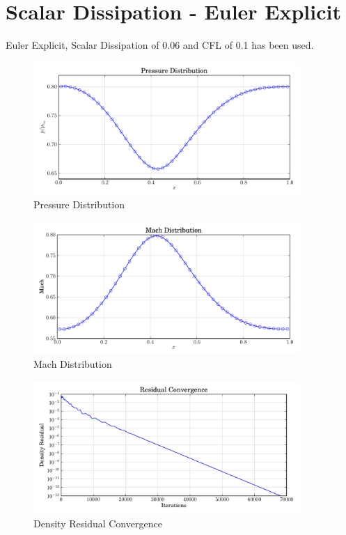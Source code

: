 \documentclass[letterpaper,12pt,]{article}
\begin{document}


\section{Scalar Dissipation - Euler Explicit}

Euler Explicit, Scalar Dissipation of 0.06 and CFL of 0.1 has been used.

\begin{figure}[!ht]
    \centering
    \includegraphics[width = 0.9\textwidth]{./figures/q1p.pdf}
    \caption {Pressure Distribution}
    \label{fig:q1p}
\end{figure}

\begin{figure}[!ht]
    \centering
    \includegraphics[width = 0.9\textwidth]{./figures/q1m.pdf}
    \caption {Mach Distribution}
    \label{fig:q1m}
\end{figure}

\begin{figure}[!ht]
    \centering
    \includegraphics[width = 0.9\textwidth]{./figures/q1c.pdf}
    \caption {Density Residual Convergence}
    \label{fig:q1p}
\end{figure}
\end{document}
